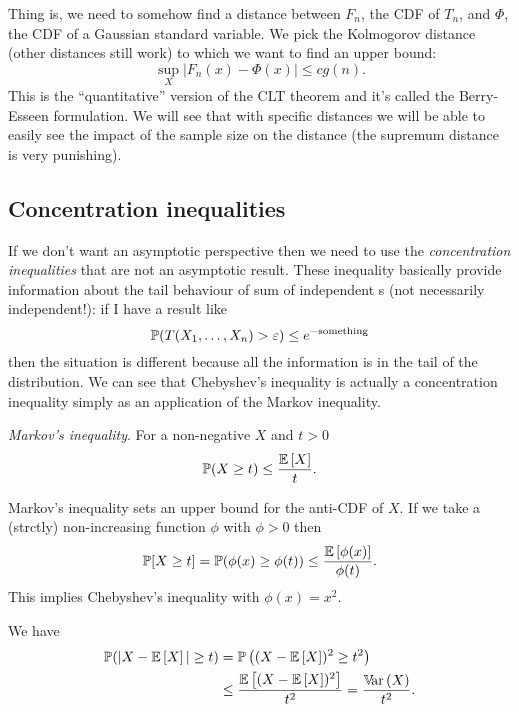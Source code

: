 \documentclass[12pt]{report}
\begin{document}
Thing is, we need to somehow find a distance between $F_{n}$, the CDF of $T_{n}$, and $\Phi$, the CDF of a Gaussian standard variable. We pick the Kolmogorov distance (other distances still work) to which we want to find an upper bound:
\begin{equation*}
	\sup_{X}\left|F_{n}(x)-\Phi(x)\right|\leq cg(n).
\end{equation*}
This is the ``quantitative'' version of the CLT theorem and it's called the Berry-Esseen formulation. We will see that with specific distances we will be able to easily see the impact of the sample size on the distance (the supremum distance is very punishing). 
\subsection{Concentration inequalities}
If we don't want an asymptotic perspective then we need to use the \emph{concentration inequalities} that are not an asymptotic result. These inequality basically provide information about the tail behaviour of sum of independent \rv s (not necessarily independent!): if I have a result like
\begin{equation*}
	\mathbb{P}(T(X_{1},\ldots,X_{n})>\varepsilon)\leq e^{-\text{something}}
\end{equation*}
then the situation is different because all the information is in the tail of the distribution. We can see that Chebyshev's inequality is actually a concentration inequality simply as an application of the Markov inequality.
\begin{proposition}
	\emph{Markov's inequality}. For a non-negative \rv{} $X$ and $t>0$
	\begin{equation*}
		\mathbb{P}(X\geq t)\leq\frac{\mathbb{E}\left[X\right]}{t}.
	\end{equation*}
\end{proposition}
Markov's inequality sets an upper bound for the anti-CDF of $X$. If we take a (strctly) non-increasing function $\phi$ with $\phi>0$ then 
\begin{equation*}
	\mathbb{P}[X\geq t]=\mathbb{P}(\phi(x)\geq\phi(t))\leq\frac{\mathbb{E}\left[\phi(x)\right]}{\phi(t)}.
\end{equation*}
This implies Chebyshev's inequality with $\phi(x)=x^{2}$.
\begin{proposition}
	We have
	\begin{align*}
		\mathbb{P}(|X-\mathbb{E}\left[X\right]|\geq t)&=\mathbb{P}\left((X-\mathbb{E}\left[X\right])^{2}\geq t^{2}\right)\\
		&\leq\frac{\mathbb{E}\left[(X-\mathbb{E}\left[X\right])^{2}\right]}{t^{2}}=\frac{\mathbb{V}\!\mathrm{ar}\,(X)}{t^{2}}.
	\end{align*}
\end{proposition}
\end{document}
